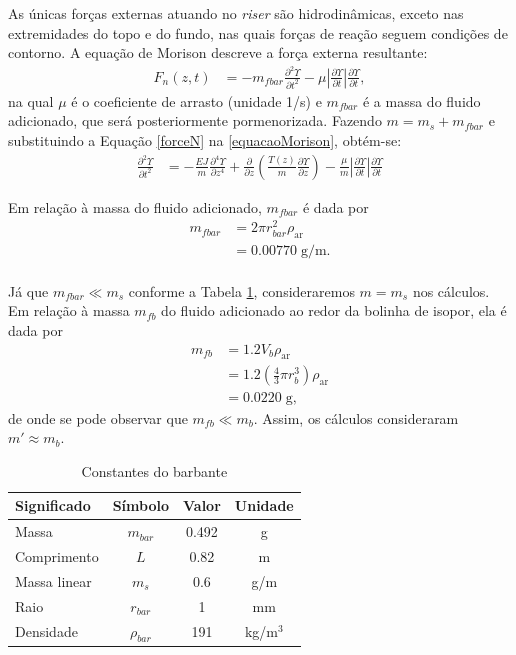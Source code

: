 As únicas forças externas atuando no \textit{riser} são hidrodinâmicas, exceto nas extremidades do topo e do fundo, nas quais forças de reação seguem condições de contorno. A equação de Morison descreve a força externa resultante: \begin{align}
	F_n(z,t) &= -m_{fbar} \frac{\partial^2 \Upsilon}{\partial t^2} - \mu \left|\frac{\partial \Upsilon}{\partial t}\right|\frac{\partial \Upsilon}{\partial t}\label{forceN},
\end{align} na qual $\mu$ é o coeficiente de arrasto (unidade 1/s) e $m_{fbar}$ é a massa do fluido adicionado, que será posteriormente pormenorizada. Fazendo $m = m_s + m_{fbar}$ e substituindo a Equação \ref{forceN} na \ref{equacaoMorison}, obtém-se: \begin{align}
	\frac{\partial^2 \Upsilon}{\partial t^2} &= -\frac{EJ}{m}\frac{\partial^4 \Upsilon}{\partial z^4} + \frac{\partial}{\partial z}\left(\frac{T(z)}{m}\frac{\partial \Upsilon}{\partial z}\right) - \frac{\mu}{m}\left|\frac{\partial \Upsilon}{\partial t}\right|\frac{\partial \Upsilon}{\partial t}
\end{align}

Em relação à massa do fluido adicionado, $m_{fbar}$ é dada por \begin{align}
	m_{fbar} &=  2 \pi r_{bar}^2 \rho_{\mathrm{ar}}\nonumber\\
	&= 0.00770\;\mathrm{g/m}.
\end{align} 

\paragraph{} Já que $m_{fbar} \ll m_s$ conforme a Tabela \ref{constanteBarbante}, consideraremos $m = m_s$ nos cálculos. Em relação à massa $m_{fb}$ do fluido adicionado ao redor da bolinha de isopor, ela é dada por\begin{align}
	m_{fb} &= 1.2 V_{b} \rho_{\mathrm{ar}}\nonumber\\
	&= 1.2 \left(\frac{4}{3}\pi r_b^3\right)\rho_{\mathrm{ar}}\nonumber\\
	&= 0.0220\;\textrm{g},
\end{align} de onde se pode observar que $m_{fb} \ll m_{b}$. Assim,  os cálculos consideraram $m' \approx m_b$.

\begin{table}[!ht]
	\centering
	\begin{tabular}{|l|c|c|c|}
		\hline
		\textbf{Significado} & \textbf{Símbolo} & \textbf{Valor} & \textbf{Unidade}\\ \hline \hline
		Massa & $m_{bar}$ & 0.492 & g\\ \hline
		Comprimento & $L$ & 0.82 & m \\ \hline
		Massa linear & $m_s$ & 0.6 & g/m\\ \hline
		Raio & $r_{bar}$ & 1 & mm\\ \hline
		Densidade & $\rho_{bar}$ & 191 & kg/m$^3$\\ \hline
	\end{tabular}
	\caption{Constantes do barbante\label{constanteBarbante}}
\end{table}

